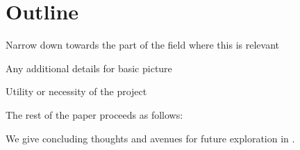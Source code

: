 \begin{sourcefigure}[ht]
    \centering

    \caption{
    }

    \label{fig:picturebook_jets}
\end{sourcefigure}

\begin{sourcefigure}[ht]
    \centering

    \caption{
    }

    \label{fig:picturebook_substructure}
\end{sourcefigure}

\begin{sourcefigure}[ht]
    \centering

    \caption{
    }

    \label{fig:picturebook_eventshapes}
\end{sourcefigure}


\section{Outline}



Narrow down towards the part of the field where this is relevant



Any additional details for basic picture

Utility or necessity of the project


The rest of the paper proceeds as follows:
%

We give concluding thoughts and avenues for future exploration in .


